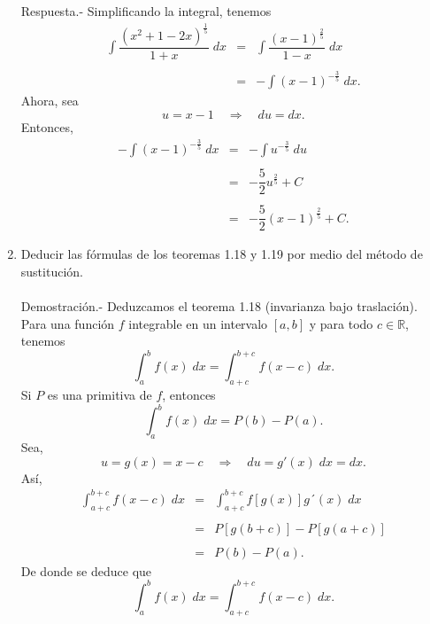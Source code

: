 \begin{enumerate}[\bfseries 1.]
	Respuesta.-\; Simplificando la integral, tenemos
	$$\begin{array}{rcl}
	    \displaystyle\int \dfrac{\left(x^2+1-2x\right)^{\frac{1}{5}}}{1+x}\; dx &=& \displaystyle\int \dfrac{(x-1)^{\frac{2}{5}}}{1-x}\; dx\\\\
										    &=&-\displaystyle\int (x-1)^{-\frac{3}{5}}\; dx.
	\end{array}$$
	Ahora, sea
	$$u=x-1\quad \Rightarrow \quad du=dx.$$
	Entonces,
	$$\begin{array}{rcl}
	    -\displaystyle\int (x-1)^{-\frac{3}{5}}\; dx &=& -\displaystyle\int u^{-\frac{3}{5}}\; du\\\\
	    										      &=&- \dfrac{5}{2}u^{\frac{2}{5}}+C\\\\
											      &=&- \dfrac{5}{2}\left(x-1\right)^{\frac{2}{5}}+C.
	\end{array}$$
	\vspace{.5cm}

    \item Deducir las fórmulas de los teoremas 1.18 y 1.19 por medio del método de sustitución.\\\\
	Demostración.-\; Deduzcamos el teorema 1.18 (invarianza bajo traslación). Para una función $f$ integrable en un intervalo $[a,b]$ y para todo $c\in \mathbb{R}$, tenemos
	$$\int_a^b f(x)\; dx = \int_{a+c}^{b+c}f(x-c)\; dx.$$
	Si $P$ es una primitiva de $f$, entonces
	$$\int_a^b f(x)\; dx = P(b)-P(a).$$
	Sea,
	$$u=g(x)=x-c\quad \Rightarrow \quad du=g'(x)\; dx = dx.$$
	Así,
	$$\begin{array}{rcl}
	    \displaystyle\int_{a+c}^{b+c} f(x-c)\; dx &=& \displaystyle\int_{a+c}^{b+c} f\left[g(x)\right]g´(x)\; dx\\\\
						      &=& P\left[g(b+c)\right]-P\left[g(a+c)\right]\\\\
						      &=& P(b)-P(a).
	\end{array}$$
	De donde se deduce que
	$$\int_a^b f(x)\; dx = \int_{a+c}^{b+c}f(x-c)\; dx.$$


\end{enumerate}
